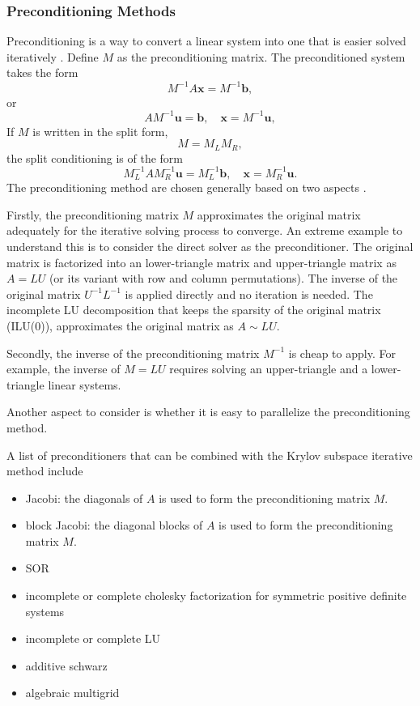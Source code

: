 \documentclass[11pt]{article}  %
\begin{document}
\subsubsection{Preconditioning Methods} \label{sec:precondition}
Preconditioning is a way to convert a linear system into one that is easier solved iteratively \cite{saad2003iterative}.  Define $M$ as the preconditioning matrix. The preconditioned system takes the form
\begin{equation}
M^{-1}A\mathbf{x}=M^{-1}\mathbf{b},
\end{equation} 
or 
\begin{equation}
AM^{-1}\mathbf{u}=\mathbf{b}, \quad \mathbf{x}=M^{-1}\mathbf{u},
\end{equation}
 If $M$ is written in the split form,
\begin{equation}
M=M_{L}M_{R},
\end{equation} 
the split conditioning is of the form
\begin{equation}
M^{-1}_{L}AM^{-1}_{R}\mathbf{u}=M^{-1}_{L}\mathbf{b}, \quad \mathbf{x}=M^{-1}_{R}\mathbf{u}.
\end{equation} 
The preconditioning method are chosen generally based on two aspects \cite{saad2003iterative}. 

Firstly,  the preconditioning matrix $M$ approximates the original matrix adequately for the iterative solving process to converge.  An extreme example to understand this is to consider the direct solver as the preconditioner.  The original matrix is factorized into an lower-triangle matrix and upper-triangle matrix as $A=LU$ (or its variant with row and column permutations). The  inverse of the original matrix $U^{-1}L^{-1}$ is applied directly and no iteration is needed. The incomplete LU decomposition that keeps the sparsity of the original matrix (ILU(0)), approximates the  original matrix as $A \sim LU$. 

Secondly,  the inverse of the preconditioning matrix $M^{-1}$ is cheap to apply. For example, the inverse of $M=LU$ requires solving an upper-triangle  and a lower-triangle linear systems. 

Another aspect to consider is whether it is easy to parallelize the preconditioning method. 

A list of preconditioners that can be combined with the Krylov subspace iterative method  include \cite{petsc-ug}
\begin{itemize}
\item Jacobi: the diagonals of $A$ is used to form the preconditioning matrix $M$.
\item block Jacobi: the diagonal blocks of $A$ is used to form the preconditioning matrix $M$.
\item SOR
\item incomplete or complete cholesky factorization for symmetric positive definite systems
\item incomplete or complete LU 
\item additive schwarz
\item algebraic multigrid
\end{itemize}
\end{document}
